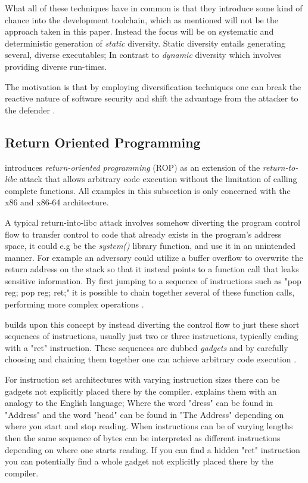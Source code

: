 What all of these techniques have in common is that they introduce some kind of chance into
the development toolchain, which as mentioned will not be the approach taken in this paper.
Instead the focus will be on systematic and deterministic generation of \textit{static}
diversity.  Static diversity entails generating several, diverse executables; In contrast
to \textit{dynamic} diversity which involves providing diverse run-times\cite{survey}.

The motivation is that by employing diversification techniques one can break the
reactive nature of software security and shift the advantage from the attacker to the
defender \cite{compiler-generated-sw-div}.

\subsection{Return Oriented Programming}
\label{rop}

\textcite{rop} introduces \textit{return-oriented programming} (ROP) as an extension of
the \textit{return-to-libc}\cite{return-into-libc} attack that allows arbitrary code
execution without the limitation of calling complete functions. All examples in this
subsection is only concerned with the x86 and x86-64 architecture.

A typical return-into-libc attack involves somehow diverting the program control
flow to transfer control to code that already exists in the program's address space,
it could e.g be the \textit{system()} library function, and use it in an unintended manner.
For example an adversary could utilize a buffer overflow to overwrite the return address on
the stack so that it instead points to a function call that leaks sensitive information.
By first jumping to a sequence of instructions such as "pop reg; pop reg; ret;" it is
possible to chain together several of these function calls, performing more complex
operations \cite{non-exec-stack,advanced-return-into-libc}.

\textcite{rop} builds upon this concept by instead diverting the control flow to just these
short sequences of instructions, usually just two or three instructions, typically ending
with a "ret" instruction. These sequences are dubbed \textit{gadgets} and by carefully
choosing and chaining them together one can achieve arbitrary code execution \cite{rop}.

For instruction set architectures with varying instruction sizes there can be gadgets not
explicitly placed there by the compiler. \textcite{rop} explains them with an analogy to
the English language; Where the word "dress" can be found in "Address" and the word "head"
can be found in "The Address" depending on where you start and stop reading. When
instructions can be of varying lengths then the same sequence of bytes can be interpreted
as different instructions depending on where one starts reading. If you can find a hidden
"ret" instruction you can potentially find a whole gadget not explicitly placed there by
the compiler.


